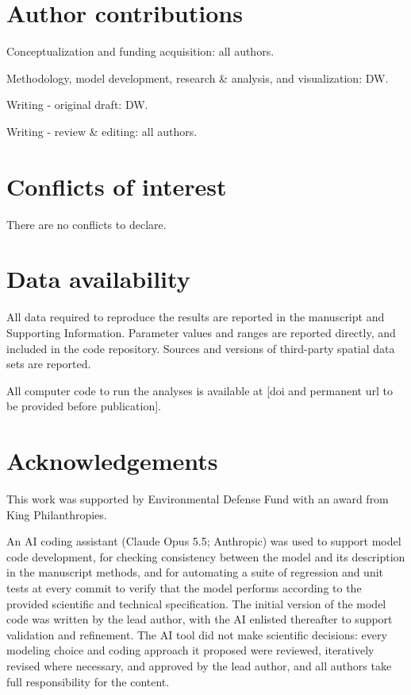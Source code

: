 \documentclass[
  letterpaper,
  twoside,
  twocolumn,
  9pt]{article}
\begin{document}
\section*{Author contributions}\label{author-contributions}

Conceptualization and funding acquisition: all authors.

Methodology, model development, research \& analysis, and visualization:
DW.

Writing - original draft: DW.

Writing - review \& editing: all authors.

\section*{Conflicts of interest}\label{conflicts-of-interest}

There are no conflicts to declare.

\section*{Data availability}\label{data-availability}

All data required to reproduce the results are reported in the
manuscript and Supporting Information. Parameter values and ranges are
reported directly, and included in the code repository. Sources and
versions of third-party spatial data sets are reported.

All computer code to run the analyses is available at {[}doi and
permanent url to be provided before publication{]}.

\section*{Acknowledgements}\label{acknowledgements}

This work was supported by Environmental Defense Fund with an award from
King Philanthropies.

An AI coding assistant (Claude Opus 5.5; Anthropic) was used to support
model code development, for checking consistency between the model and
its description in the manuscript methods, and for automating a suite of
regression and unit tests at every commit to verify that the model
performs according to the provided scientific and technical
specification. The initial version of the model code was written by the
lead author, with the AI enlisted thereafter to support validation and
refinement. The AI tool did not make scientific decisions: every
modeling choice and coding approach it proposed were reviewed,
iteratively revised where necessary, and approved by the lead author,
and all authors take full responsibility for the content.
\end{document}
